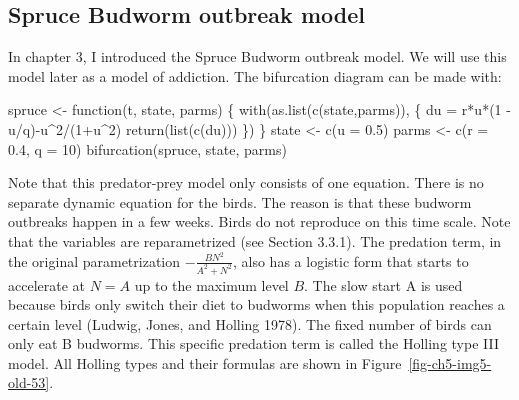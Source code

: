 \documentclass[
  letterpaper,
]{scrbook}
\newenvironment{Shaded}{\begin{snugshade}}{\end{snugshade}}
\newcommand{\AttributeTok}[1]{\textcolor[rgb]{0.40,0.45,0.13}{#1}}
\newcommand{\ControlFlowTok}[1]{\textcolor[rgb]{0.00,0.23,0.31}{#1}}
\newcommand{\DecValTok}[1]{\textcolor[rgb]{0.68,0.00,0.00}{#1}}
\newcommand{\FloatTok}[1]{\textcolor[rgb]{0.68,0.00,0.00}{#1}}
\newcommand{\FunctionTok}[1]{\textcolor[rgb]{0.28,0.35,0.67}{#1}}
\newcommand{\NormalTok}[1]{\textcolor[rgb]{0.00,0.23,0.31}{#1}}
\newcommand{\OtherTok}[1]{\textcolor[rgb]{0.00,0.23,0.31}{#1}}
\newcommand{\SpecialCharTok}[1]{\textcolor[rgb]{0.37,0.37,0.37}{#1}}
\begin{document}
\hypertarget{spruce-budworm-outbreak-model}{%
\subsection{Spruce Budworm outbreak
model}\label{spruce-budworm-outbreak-model}}

In chapter 3, I introduced the Spruce Budworm outbreak model. We will
use this model later as a model of addiction. The bifurcation diagram
can be made with:

\begin{Shaded}
\begin{Highlighting}[]
\NormalTok{spruce }\OtherTok{\textless{}{-}} \ControlFlowTok{function}\NormalTok{(t, state, parms) \{}
  \FunctionTok{with}\NormalTok{(}\FunctionTok{as.list}\NormalTok{(}\FunctionTok{c}\NormalTok{(state,parms)), \{}
\NormalTok{    du }\OtherTok{=}\NormalTok{ r}\SpecialCharTok{*}\NormalTok{u}\SpecialCharTok{*}\NormalTok{(}\DecValTok{1} \SpecialCharTok{{-}}\NormalTok{ u}\SpecialCharTok{/}\NormalTok{q)}\SpecialCharTok{{-}}\NormalTok{u}\SpecialCharTok{\^{}}\DecValTok{2}\SpecialCharTok{/}\NormalTok{(}\DecValTok{1}\SpecialCharTok{+}\NormalTok{u}\SpecialCharTok{\^{}}\DecValTok{2}\NormalTok{)}
    \FunctionTok{return}\NormalTok{(}\FunctionTok{list}\NormalTok{(}\FunctionTok{c}\NormalTok{(du)))}
\NormalTok{  \})}
\NormalTok{\}}
\NormalTok{state }\OtherTok{\textless{}{-}} \FunctionTok{c}\NormalTok{(}\AttributeTok{u =} \FloatTok{0.5}\NormalTok{)}
\NormalTok{parms }\OtherTok{\textless{}{-}} \FunctionTok{c}\NormalTok{(}\AttributeTok{r =} \FloatTok{0.4}\NormalTok{, }\AttributeTok{q =} \DecValTok{10}\NormalTok{)}
\FunctionTok{bifurcation}\NormalTok{(spruce, state, parms)}
\end{Highlighting}
\end{Shaded}

Note that this predator-prey model only consists of one equation. There
is no separate dynamic equation for the birds. The reason is that these
budworm outbreaks happen in a few weeks. Birds do not reproduce on this
time scale. Note that the variables are reparametrized (see Section
3.3.1). The predation term, in the original parametrization
\(- \frac{BN^{2}}{A^{2} + N^{2}}\), also has a logistic form that starts
to accelerate at \(N = A\) up to the maximum level \(B\). The slow start
A is used because birds only switch their diet to budworms when this
population reaches a certain level (Ludwig, Jones, and Holling 1978).
The fixed number of birds can only eat B budworms. This specific
predation term is called the Holling type III model. All Holling types
and their formulas are shown in Figure~\ref{fig-ch5-img5-old-53}.
\end{document}

